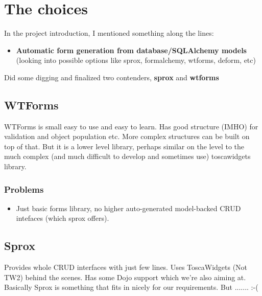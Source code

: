 \documentclass[letterpaper,10pt,english]{sphinxmanual}
\begin{document}
\section{The choices}
\label{form-validation-library-choice:the-choices}
In the project introduction, I mentioned something along the lines:
\begin{itemize}
\item {} 
\textbf{Automatic form generation from database/SQLAlchemy models} (looking into possible options like sprox, formalchemy, wtforms, deform, etc)

\end{itemize}

Did some digging and finalized two contenders, \textbf{sprox} and \textbf{wtforms}


\subsection{WTForms}
\label{form-validation-library-choice:wtforms}
WTForms is small easy to use and easy to learn. Has good structure (IMHO) for validation and object population etc. More complex structures can be built on top of that. But it is a lower level library, perhaps similar on the level to the much complex (and much difficult to develop and sometimes use) toscawidgets library.


\subsubsection{Problems}
\label{form-validation-library-choice:problems}\begin{itemize}
\item {} 
Just basic forms library, no higher auto-generated model-backed CRUD intefaces (which sprox offers).

\end{itemize}


\subsection{Sprox}
\label{form-validation-library-choice:sprox}
Provides whole CRUD interfaces with just few lines. Uses ToscaWidgets (Not TW2) behind the scenes. Has some Dojo support which we're also aiming at. Basically Sprox is something that fits in nicely for our requirements. But ....... :-(
\end{document}
